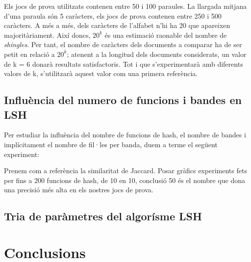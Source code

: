 \documentclass[catalan, 12pt]{report}
\begin{document}
Els jocs de prova utilitzats contenen entre 50 i 100 paraules. La llargada mitjana d'una paraula són 5 caràcters, els jocs de prova contenen entre 250 i 500 caràcters. A més a més, dels caràcters de l'alfabet n'hi ha 20 que apareixen majoritàriament. Així doncs, \(  20^k \) és una estimació raonable del nombre de \textit{shingles}. Per tant, el nombre de caràcters dels documents a comparar ha de ser petit en relació a \(  20^k \); atenent a la longitud dels documents considerats, un valor de k = 6 donarà resultats satisfactoris. Tot i que s'experimentarà amb diferents valors de k, s'utilitzarà aquest valor com una primera referència.

\section{Influència del numero de funcions i bandes en LSH}

Per estudiar la influència del nombre de funcions de hash, el nombre de bandes i implícitament el nombre de fil·les per banda, duem a terme el següent experiment: \newline

Prenem com a referència la similaritat de Jaccard. Posar gràfics experiments fets per fins a 200 funcions de hash, de 10 en 10, conclusió 50 és el nombre que dona una precisió més alta en els nostres jocs de prova.


\section{Tria de paràmetres del algorísme LSH}

\chapter{Conclusions}
\end{document}
